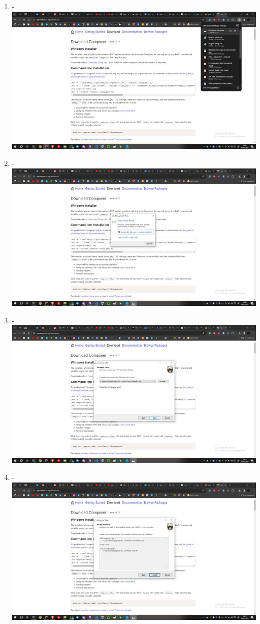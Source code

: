 \documentclass[12pt,titlepage]{article}
\begin{document}
\begin{enumerate}[label= \alph*.]
    \item - \\ \includegraphics[width=.9\textwidth]{images/figures/Composer 1.jpg}
    \item - \\ \includegraphics[width=.9\textwidth]{images/figures/Composer 2.jpg}
    \newpage
    \item - \\ \includegraphics[width=.9\textwidth]{images/figures/Composer 3.jpg}
    \item - \\ \includegraphics[width=.9\textwidth]{images/figures/Composer 4.jpg}

\end{enumerate}
\end{document}
